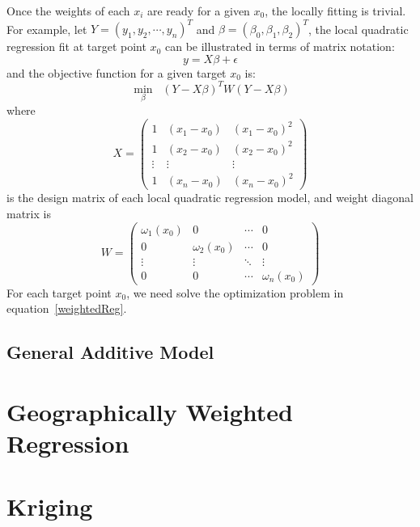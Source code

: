 Once the weights of each $x_i$ are ready for a given $x_0$, the locally fitting
is trivial. For example, let $Y=(y_1, y_2, \cdots, y_n)^{T}$ and 
$\beta = (\beta_0, \beta_1, \beta_2)^{T}$, the local quadratic regression fit at
target point $x_0$ can be illustrated in terms of matrix notation:
\begin{equation}
y = X \beta + \epsilon
\end{equation} 
and the objective function for a given target $x_0$ is: 
\begin{equation}
\label{weightedReg}
\min_{\beta} \;\; (Y - X\beta)^TW(Y - X\beta)
\end{equation} 
where
\begin{equation}
X =  
\begin{pmatrix}
  1 & (x_1-x_0) & (x_1-x_0)^2 \\
  1 & (x_2-x_0) & (x_2-x_0)^2 \\
  \vdots  & \vdots & \vdots  \\
  1 & (x_n-x_0) & (x_n-x_0)^2 
\end{pmatrix}
\end{equation} 
is the design matrix of each local quadratic regression model, and weight diagonal
matrix is
\begin{equation}
W =  
\begin{pmatrix}
  \omega_1(x_0) & 0 & \cdots & 0 \\
  0 & \omega_2(x_0) & \cdots & 0 \\
  \vdots  & \vdots & \ddots & \vdots  \\
  0 & 0 & \cdots & \omega_n(x_0) 
\end{pmatrix}
\end{equation} 
For each target point $x_0$, we need solve the optimization problem in 
equation~\ref{weightedReg}. 


\subsection{General Additive Model}

\section{Geographically Weighted Regression}

\section{Kriging}

